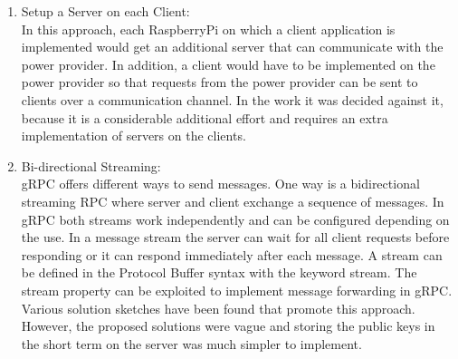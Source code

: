 \begin{enumerate}
\item Setup a Server on each Client:\\
In this approach, each RaspberryPi on which a client application is implemented would get an additional server that can communicate with the power provider. In addition, a client would have to be implemented on the power provider so that requests from the power provider can be sent to clients over a communication channel. In the work it was decided against it, because it is a considerable additional effort and requires an extra implementation of servers on the clients.
\item Bi-directional Streaming:\\
gRPC offers different ways to send messages. One way is a bidirectional streaming RPC where server and client exchange a sequence of messages. In gRPC both streams work independently and can be configured depending on the use.%
In a message stream the server can wait for all client requests before responding or it can respond immediately after each message.  A stream can be defined in the Protocol Buffer syntax with the keyword stream. The stream property can be exploited to implement message forwarding in gRPC. Various solution sketches have been found that promote this approach. However, the proposed solutions were vague and storing the public keys in the short term on the server was much simpler to implement. 

\end{enumerate}\\

